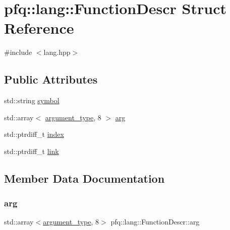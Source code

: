 \hypertarget{structpfq_1_1lang_1_1FunctionDescr}{}\section{pfq\+:\+:lang\+:\+:Function\+Descr Struct Reference}
\label{structpfq_1_1lang_1_1FunctionDescr}


{\ttfamily \#include $<$lang.\+hpp$>$}

\subsection*{Public Attributes}
\begin{DoxyCompactItemize}
\item 
std\+::string \hyperlink{structpfq_1_1lang_1_1FunctionDescr_a21f51c65f55dddd54de1171d8914c030}{symbol}
\item 
std\+::array$<$ \hyperlink{structpfq_1_1lang_1_1argument__type}{argument\+\_\+type}, 8 $>$ \hyperlink{structpfq_1_1lang_1_1FunctionDescr_af1fe3a86f26dc3f74532ce718a195006}{arg}
\item 
std\+::ptrdiff\+\_\+t \hyperlink{structpfq_1_1lang_1_1FunctionDescr_ae818027f48319f8f4f59d3c47202d883}{index}
\item 
std\+::ptrdiff\+\_\+t \hyperlink{structpfq_1_1lang_1_1FunctionDescr_a09e00f9d57300893f95661b56e6b114e}{link}
\end{DoxyCompactItemize}


\subsection{Member Data Documentation}
\mbox{\label{structpfq_1_1lang_1_1FunctionDescr_af1fe3a86f26dc3f74532ce718a195006}} 
\subsubsection{\texorpdfstring{arg}{arg}}
{\footnotesize\ttfamily std\+::array$<$\hyperlink{structpfq_1_1lang_1_1argument__type}{argument\+\_\+type}, 8$>$ pfq\+::lang\+::\+Function\+Descr\+::arg}

\mbox{\label{structpfq_1_1lang_1_1FunctionDescr_ae818027f48319f8f4f59d3c47202d883}} 
